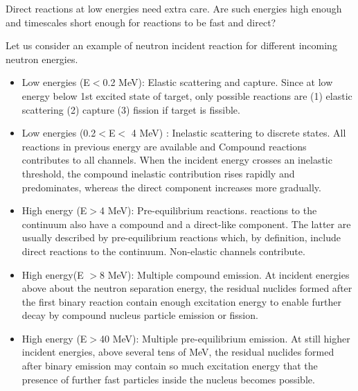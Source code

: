 \documentclass[11pt]{book}
\begin{document}
Direct reactions at low energies need extra care. Are such energies high enough and timescales short
enough for reactions to be fast and direct?

Let us consider an example of neutron incident reaction for different incoming neutron energies.
\begin{itemize}
\item Low energies (E$<$0.2 MeV): Elastic scattering and capture. Since at low energy below 1st excited state of target, only possible reactions are (1) elastic scattering (2) capture (3) fission if target is fissible. 
\item Low energies (0.2$<$E$<$ 4 MeV) : Inelastic scattering to discrete states. 
  All reactions in previous energy are available and Compound reactions contributes to 
  all channels.  When the
  incident energy crosses an inelastic threshold, the compound inelastic contribution rises rapidly and predominates,
  whereas the direct component increases more gradually.
\item High energy (E$>$4 MeV): Pre-equilibrium reactions. 
  reactions to the continuum also have a compound and a direct-like component.
  The latter are usually described by pre-equilibrium reactions which, by
  definition, include direct reactions to the continuum. 
  Non-elastic channels contribute. 
\item High energy(E $>$8 MeV): Multiple compound emission. At incident energies above about the neutron separation energy, the residual nuclides formed after the
first binary reaction contain enough excitation energy to enable further decay by compound nucleus
particle emission or fission. 
\item High energy (E$>$40 MeV): Multiple pre-equilibrium emission. At still higher incident energies, above several tens of MeV, the residual nuclides formed after binary
emission may contain so much excitation energy that the presence of further fast particles inside the
nucleus becomes possible. 
\end{itemize}
\end{document}
